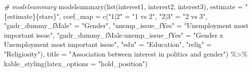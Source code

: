 \documentclass[
]{article}
\newenvironment{Shaded}{\begin{snugshade}}{\end{snugshade}}
\newcommand{\AttributeTok}[1]{\textcolor[rgb]{0.77,0.63,0.00}{#1}}
\newcommand{\CommentTok}[1]{\textcolor[rgb]{0.56,0.35,0.01}{\textit{#1}}}
\newcommand{\FunctionTok}[1]{\textcolor[rgb]{0.00,0.00,0.00}{#1}}
\newcommand{\NormalTok}[1]{#1}
\newcommand{\OtherTok}[1]{\textcolor[rgb]{0.56,0.35,0.01}{#1}}
\newcommand{\SpecialCharTok}[1]{\textcolor[rgb]{0.00,0.00,0.00}{#1}}
\newcommand{\StringTok}[1]{\textcolor[rgb]{0.31,0.60,0.02}{#1}}
\begin{document}
\begin{Shaded}
\begin{Highlighting}[]
\CommentTok{\# modelsummary }
\FunctionTok{modelsummary}\NormalTok{(}\FunctionTok{list}\NormalTok{(interest1, interest2, interest3), }
             \AttributeTok{estimate =} \StringTok{"\{estimate\}\{stars\}"}\NormalTok{,}
             \AttributeTok{coef\_map =} \FunctionTok{c}\NormalTok{(}\StringTok{"1|2"} \OtherTok{=} \StringTok{"1 vs 2"}\NormalTok{,}
                          \StringTok{"2|3"} \OtherTok{=} \StringTok{"2 vs 3"}\NormalTok{,}
                          \StringTok{"gndr\_dummy\_fMale"} \OtherTok{=} \StringTok{"Gender"}\NormalTok{,}
                          \StringTok{"unemp\_issue\_fYes"} \OtherTok{=} \StringTok{"Unemployment most important issue"}\NormalTok{,}
                          \StringTok{"gndr\_dummy\_fMale:unemp\_issue\_fYes"} \OtherTok{=} \StringTok{"Gender x Unemployment most important issue"}\NormalTok{,}
                          \StringTok{"edu"} \OtherTok{=} \StringTok{"Education"}\NormalTok{,}
                          \StringTok{"relig"} \OtherTok{=} \StringTok{"Religiosity"}\NormalTok{),}
             \AttributeTok{title =} \StringTok{"Association between interest in politics and gender"}\NormalTok{) }\SpecialCharTok{\%\textgreater{}\%}
  \FunctionTok{kable\_styling}\NormalTok{(}\AttributeTok{latex\_options =} \StringTok{"hold\_position"}\NormalTok{)}
\end{Highlighting}
\end{Shaded}
\end{document}
